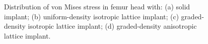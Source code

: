 \documentclass[12pt]{extbook}
\begin{document}
\begin{figure}[htbp]
\caption{Distribution of von Mises stress in femur head with: (a) solid implant; (b) uniform-density isotropic lattice implant; (c) graded-density isotropic lattice implant; (d) graded-density anisotropic lattice implant.}
\label{stress_femur}
\end{figure}

\begin{figure}[htbp]
\centering
{}

\end{figure}
\end{document}
